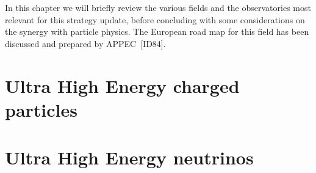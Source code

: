 \documentclass[../report.tex]{subfiles}
\providecommand{\main}{..}
\begin{document}
In this chapter we will briefly review the various fields and the  observatories
most relevant for this strategy update, before concluding with some considerations on the synergy with particle physics. The European road map for this field has been discussed and prepared by APPEC~[ID84].

\section{Ultra High Energy charged particles} 

\section{Ultra High Energy neutrinos} 




\end{document}
